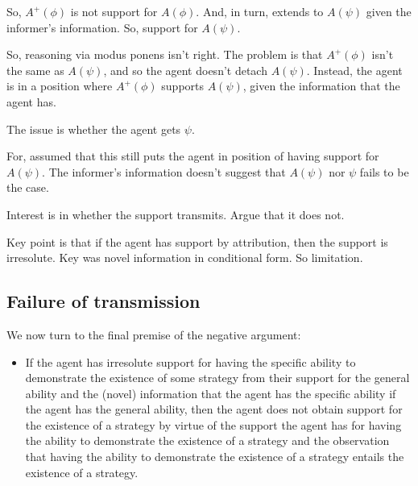 \documentclass[10pt]{article}
\begin{document}
\begin{note}
  So, \(A^{+}(\phi)\) is not support for \(A(\phi)\).
  And, in turn, extends to \(A(\psi)\) given the informer's information.
  So, support for \(A(\psi)\).

  So, reasoning via modus ponens isn't right.
  The problem is that \(A^{+}(\phi)\) isn't the same as \(A(\psi)\), and so the agent doesn't detach \(A(\psi)\).
  Instead, the agent is in a position where \(A^{+}(\phi)\) supports \(A(\psi)\), given the information that the agent has.

  The issue is whether the agent gets \(\psi\).

  For, assumed that this still puts the agent in position of having support for \(A(\psi)\).
  The informer's information doesn't suggest that \(A(\psi)\) nor \(\psi\) fails to be the case.

  Interest is in whether the support transmits.
  Argue that it does not.
\end{note}

\begin{note}[Summary]
  Key point is that if the agent has support by attribution, then the support is irresolute.
  Key was novel information in conditional form.
  So limitation.
\end{note}



\subsection{Failure of transmission}
\label{sec:failure-transmission}

We now turn to the final premise of the negative argument:
\begin{itemize}
\item If the agent has irresolute support for having the specific ability to demonstrate the existence of some strategy from their support for the general ability and the (novel) information that the agent has the specific ability if the agent has the general ability, then the agent does not obtain support for the existence of a strategy by virtue of the support the agent has for having the ability to demonstrate the existence of a strategy and the observation that having the ability to demonstrate the existence of a strategy entails the existence of a strategy.
\end{itemize}
\end{document}
